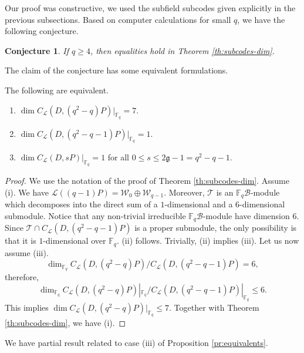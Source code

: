 \documentclass[entropy,article,submit,pdftex,moreauthors]{Definitions/mdpi}
\newtheorem{Conjecture}{Conjecture}%
\newcommand{\g}{\mathfrak{g}}
\begin{document}
Our proof was constructive, we used the subfield subcodes given explicitly in the previous subsections. Based on computer calculations for small $q$, we have the following conjecture. 

\begin{Conjecture} 
	If $q\geq 4$, then equalities hold in Theorem \ref{th:subcodes-dim}.
\end{Conjecture}

The claim of the conjecture has some equivalent formulations.

\begin{Proposition} \label{pr:equivalents}
The following are equivalent.
\begin{enumerate}[label=(\roman*)]
\item $\dim C_\mathcal{L}(D,(q^2-q)P)|_{\mathbb{F}_q}=7$.
\item $\dim C_\mathcal{L}(D,(q^2-q-1)P)|_{\mathbb{F}_q}=1$.
\item $\dim C_\mathcal{L}(D,sP)|_{\mathbb{F}_q}=1$ for all $0\leq s\leq 2\g-1=q^2-q-1$.
\end{enumerate}
\end{Proposition}
\begin{proof}
We use the notation of the proof of Theorem \ref{th:subcodes-dim}. Assume (i). We have $\mathscr{L}((q-1)P)=\mathcal{W}_0\oplus \mathcal{W}_{q-1}$. Moreover, $\mathcal{T}$ is an $\mathbb{F}_q \mathcal{B}$-module which decomposes into the direct sum of a $1$-dimensional and a $6$-dimensional submodule. Notice that any non-trivial irreducible $\mathbb{F}_q \mathcal{B}$-module have dimension $6$. Since $\mathcal{T}\cap C_\mathcal{L}(D,(q^2-q-1)P)$ is a proper submodule, the only possibility is that it is $1$-dimensional over $\mathbb{F}_q$. (ii) follows. Trivially, (ii) implies (iii). Let us now assume (iii).
\[\dim_{\mathbb{F}_q} C_\mathcal{L}(D,(q^2-q)P) / C_\mathcal{L}(D,(q^2-q-1)P) = 6,\]
therefore,
\[\dim_{\mathbb{F}_q} C_\mathcal{L}(D,(q^2-q)P)|_{\mathbb{F}_q} / C_\mathcal{L}(D,(q^2-q-1)P)|_{\mathbb{F}_q} \leq 6.\]
This implies $\dim C_\mathcal{L}(D,(q^2-q)P)|_{\mathbb{F}_q} \leq 7$. Together with Theorem \ref{th:subcodes-dim}, we have (i). 
\end{proof}

We have partial result related to case (iii) of Proposition \ref{pr:equivalents}.
\end{document}
